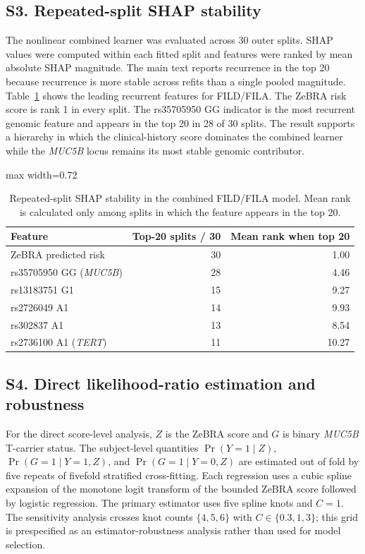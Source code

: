 \subsection*{S3. Repeated-split SHAP stability}
The nonlinear combined learner was evaluated across 30 outer splits. SHAP values were computed within each fitted split and features were ranked by mean absolute SHAP magnitude. The main text reports recurrence in the top 20 because recurrence is more stable across refits than a single pooled magnitude. Table~\ref{tab:supp-shap} shows the leading recurrent features for FILD/FILA. The ZeBRA risk score is rank 1 in every split. The rs35705950 GG indicator is the most recurrent genomic feature and appears in the top 20 in 28 of 30 splits. The result supports a hierarchy in which the clinical-history score dominates the combined learner while the \textit{MUC5B} locus remains its most stable genomic contributor.

\begin{table}[!t]
\caption{Repeated-split SHAP stability in the combined FILD/FILA model. Mean rank is calculated only among splits in which the feature appears in the top 20.}
\label{tab:supp-shap}
\centering\small
\setlength{\tabcolsep}{3pt}
\renewcommand{\arraystretch}{1.04}
\begin{adjustbox}{max width=0.72\textwidth}
\begin{tabular}{lrr}
\toprule
Feature & Top-20 splits / 30 & Mean rank when top 20\\
\midrule
ZeBRA predicted risk & 30 & 1.00\\
rs35705950 GG (\textit{MUC5B}) & 28 & 4.46\\
rs13183751 G1 & 15 & 9.27\\
rs2726049 A1 & 14 & 9.93\\
rs302837 A1 & 13 & 8.54\\
rs2736100 A1 (\textit{TERT}) & 11 & 10.27\\
\bottomrule
\end{tabular}
\end{adjustbox}
\end{table}

\subsection*{S4. Direct likelihood-ratio estimation and robustness}
For the direct score-level analysis, $Z$ is the ZeBRA score and $G$ is binary \textit{MUC5B} T-carrier status. The subject-level quantities $\Pr(Y=1\mid Z)$, $\Pr(G=1\mid Y=1,Z)$, and $\Pr(G=1\mid Y=0,Z)$ are estimated out of fold by five repeats of fivefold stratified cross-fitting. Each regression uses a cubic spline expansion of the monotone logit transform of the bounded ZeBRA score followed by logistic regression. The primary estimator uses five spline knots and $C=1$. The sensitivity analysis crosses knot counts $\{4,5,6\}$ with $C\in\{0.3,1,3\}$; this grid is prespecified as an estimator-robustness analysis rather than used for model selection.

